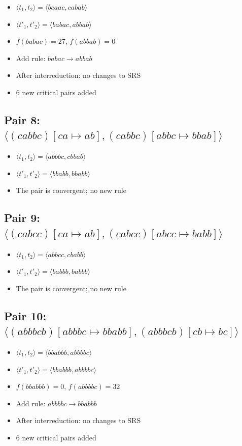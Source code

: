 \documentclass{article}
\begin{document}
\begin{itemize}
\item $\langle t_1, t_2 \rangle = \langle bcaac, cabab \rangle$
\item $\langle t'_1, t'_2 \rangle = \langle babac, abbab \rangle$
\item $f(babac) = 27$, $f(abbab) = 0$
\item Add rule: $babac \to abbab$
\item After interreduction: no changes to SRS
\item 6 new critical pairs added
\end{itemize}

\subsection{Pair 8: $\langle (cabbc)[ca \mapsto ab], (cabbc)[abbc \mapsto bbab] \rangle$}

\begin{itemize}
\item $\langle t_1, t_2 \rangle = \langle abbbc, cbbab \rangle$
\item $\langle t'_1, t'_2 \rangle = \langle bbabb, bbabb \rangle$
\item The pair is convergent; no new rule
\end{itemize}

\subsection{Pair 9: $\langle (cabcc)[ca \mapsto ab], (cabcc)[abcc \mapsto babb] \rangle$}

\begin{itemize}
\item $\langle t_1, t_2 \rangle = \langle abbcc, cbabb \rangle$
\item $\langle t'_1, t'_2 \rangle = \langle babbb, babbb \rangle$
\item The pair is convergent; no new rule
\end{itemize}

\subsection{Pair 10: $\langle (abbbcb)[abbbc \mapsto bbabb], (abbbcb)[cb \mapsto bc] \rangle$}

\begin{itemize}
\item $\langle t_1, t_2 \rangle = \langle bbabbb, abbbbc \rangle$
\item $\langle t'_1, t'_2 \rangle = \langle bbabbb, abbbbc \rangle$
\item $f(bbabbb) = 0$, $f(abbbbc) = 32$
\item Add rule: $abbbbc \to bbabbb$
\item After interreduction: no changes to SRS
\item 6 new critical pairs added
\end{itemize}
\end{document}
